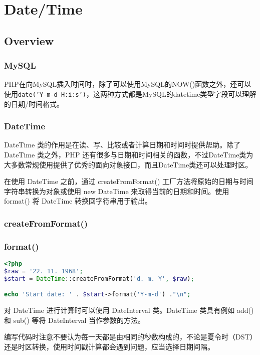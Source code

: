 \part{Date/Time}


\chapter{Overview}


\section{MySQL}

PHP在向MySQL插入时间时，除了可以使用MySQL的NOW()函数之外，还可以使用\texttt{date('Y-m-d H:i:s')}，这两种方式都是MySQL的datetime类型字段可以理解的日期/时间格式。


\section{DateTime}



DateTime 类的作用是在读、写、比较或者计算日期和时间时提供帮助。除了 DateTime 类之外，PHP 还有很多与日期和时间相关的函数，不过DateTime类为大多数常规使用提供了优秀的面向对象接口，而且DateTime类还可以处理时区。

在使用 DateTime 之前，通过 createFromFormat() 工厂方法将原始的日期与时间字符串转换为对象或使用 new DateTime 来取得当前的日期和时间。使用 format() 将 DateTime 转换回字符串用于输出。

\section{createFromFormat()}



\section{format()}


\begin{lstlisting}[language=PHP]
<?php
$raw = '22. 11. 1968';
$start = DateTime::createFromFormat('d. m. Y', $raw);

echo 'Start date: ' . $start->format('Y-m-d') ."\n";
\end{lstlisting}


对 DateTime 进行计算时可以使用 DateInterval 类。DateTime 类具有例如 add() 和 sub() 等将 DateInterval 当作参数的方法。

编写代码时注意不要认为每一天都是由相同的秒数构成的，不论是夏令时（DST）还是时区转换，使用时间戳计算都会遇到问题，应当选择日期间隔。

